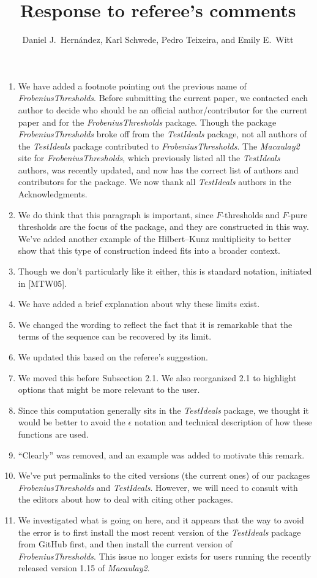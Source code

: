 \documentclass{amsart}
\begin{document}
\title{Response to referee's comments}
\author{Daniel J.\ Hern\'andez,  Karl Schwede, Pedro Teixeira, and Emily E.\ Witt}
\maketitle

\begin{enumerate}
\item We have added a footnote pointing out the previous name of \emph{FrobeniusThresholds}.  Before submitting the current paper, we contacted each author to decide who should be an official author/contributor for the current paper and for the \emph{FrobeniusThresholds} package.
Though the package \emph{FrobeniusThresholds} broke off from the \emph{TestIdeals} package, not all authors of the \emph{TestIdeals} package contributed to \emph{FrobeniusThresholds}.
The \emph{Macaulay2} site for \emph{FrobeniusThresholds}, which previously listed all the \emph{TestIdeals} authors, was recently updated, and now has the correct list of authors and contributors for the package. 
We now thank all \emph{TestIdeals} authors in the Acknowledgments. 
\item We do think that this paragraph is important, since $F$-thresholds and $F$-pure thresholds are the focus of the package, and they are constructed in this way.  We've added another example of the Hilbert--Kunz multiplicity to better show that this type of construction indeed fits into a broader context. 
\item Though we don't particularly like it either, this is standard notation, initiated in [MTW05].
\item We have added a brief explanation about why these limits exist. 
\item We changed the wording to reflect the fact that it is remarkable that the terms of the sequence can be recovered by its limit. 
\item We updated this based on the referee's suggestion. 
\item We moved this before Subsection 2.1.  We also reorganized 2.1 to highlight options that might be more relevant to the user. 
\item Since this computation generally sits in the \emph{TestIdeals} package, we thought it would be better to avoid the  $\epsilon$ notation and technical description of how these functions are used. 
\item ``Clearly'' was removed, and an example was added to motivate this remark. 
\item We've put permalinks to the cited versions (the current ones) of our packages  \emph{FrobeniusThresholds} and \emph{TestIdeals}. 
However, we will need to consult with the editors about how to deal with citing other packages.  
\item We investigated what is going on here, and it appears that the way to avoid the error is to first install the most recent version of the \emph{TestIdeals} package from GitHub first, and then install the current version of \emph{FrobeniusThresholds}. 
This issue no longer exists for users running the recently released version 1.15 of \emph{Macaulay2}.

\end{enumerate}
\end{document}
